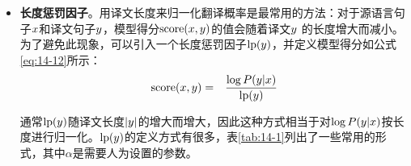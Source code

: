 \begin{itemize}
\vspace{0.5em}
\item {\small\sffamily\bfseries{长度惩罚因子}}。用译文长度来归一化翻译概率是最常用的方法：对于源语言句子${x}$和译文句子${y}$，模型得分$\textrm{score}({x},{y})$的值会随着译文${y}$ 的长度增大而减小。为了避免此现象，可以引入一个长度惩罚因子$\textrm{lp}({y})$，并定义模型得分如公式\eqref{eq:14-12}所示：
\begin{eqnarray}
\textrm{score}({x},{y}) &=& \frac{\log {P}({y}\vert{x})}{\textrm{lp}({y})}
\label{eq:14-12}
\end{eqnarray}

通常$\textrm{lp}({y})$随译文长度$\vert{y}\vert$的增大而增大，因此这种方式相当于对$\log {P}({y}\vert{x})$按长度进行归一化。$\textrm{lp}({y})$的定义方式有很多，表\ref{tab:14-1}列出了一些常用的形式，其中$\alpha$是需要人为设置的参数。


\end{itemize}
